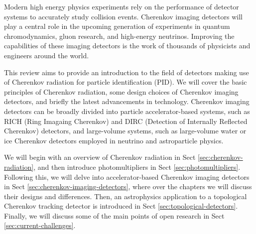 
Modern high energy physics experiments rely on the performance of detector systems to accurately study collision events. Cherenkov 
imaging detectors will play a central role in the upcoming generation of
experiments in quantum chromodynamics, gluon research, and high-energy neutrinos. 
Improving the capabilities of these imaging detectors is the work
of thousands of physicists and engineers around the world.

This review aims to provide an introduction to the field of detectors making use of Cherenkov radiation for particle identification (PID). We will cover the basic principles of Cherenkov radiation, some design choices of Cherenkov imaging detectors, and briefly the latest advancements in technology. Cherenkov imaging detectors can be broadly divided into particle accelerator-based systems, such as RICH (Ring Imagaing Cherenkov) and DIRC (Detection of Internally Reflected Cherenkov) detectors, and large-volume systems, such as large-volume water or ice Cherenkov detectors employed in neutrino and astroparticle physics.

We will begin with an overview of Cherenkov radiation
in Sect \nolinebreak\ref{sec:cherenkov-radiation}, and then introduce photomultipliers in Sect \nolinebreak\ref{sec:photomultipliers}. Following this, we will
delve into accelerator-based Cherenkov imaging detectors in Sect \nolinebreak\ref{sec:cherenkov-imaging-detectors}, 
where over the chapters we will discuss their designs and differences. Then, an astrophysics application to a topological Cherenkov tracking detector is introduced in Sect \ref{sec:topological-detectors}. Finally, 
we will discuss some of the main points of open research in Sect \nolinebreak\ref{sec:current-challenges}.